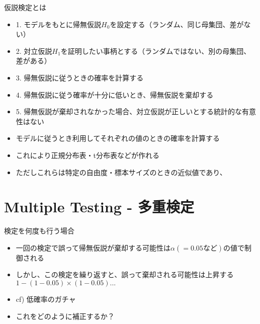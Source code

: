 \documentclass[cjk, aspectratio=169]{beamer}
\begin{document}
    \begin{frame}{仮説検定とは}
    \begin{itemize}
    \item 1. モデルをもとに帰無仮説$H_0$を設定する（ランダム、同じ母集団、差がない）
    \item 2. 対立仮説$H_1$を証明したい事柄とする（ランダムではない、別の母集団、差がある）
    \item 3. 帰無仮説に従うときの確率を計算する
    \item 4. 帰無仮説に従う確率が十分に低いとき、帰無仮説を棄却する
    \item 5. 帰無仮説が棄却されなかった場合、対立仮説が正しいとする統計的な有意性はない
    \item モデルに従うとき利用してそれぞれの値のときの確率を計算する
    \item これにより正規分布表・t分布表などが作れる
    \item ただしこれらは特定の自由度・標本サイズのときの近似値であり、
    \end{itemize}
    \end{frame}

\section{Multiple Testing - 多重検定}

    \begin{frame}{検定を何度も行う場合}
    \begin{itemize}
    \item 一回の検定で誤って帰無仮説が棄却する可能性は$\alpha(=0.05など)$の値で制御される
    \item しかし、この検定を繰り返すと、誤って棄却される可能性は上昇する $1 - (1-0.05)\times (1-0.05) ...$
    \item cf) 低確率のガチャ
    \item これをどのように補正するか？
    \end{itemize}
    \end{frame}
\end{document}
